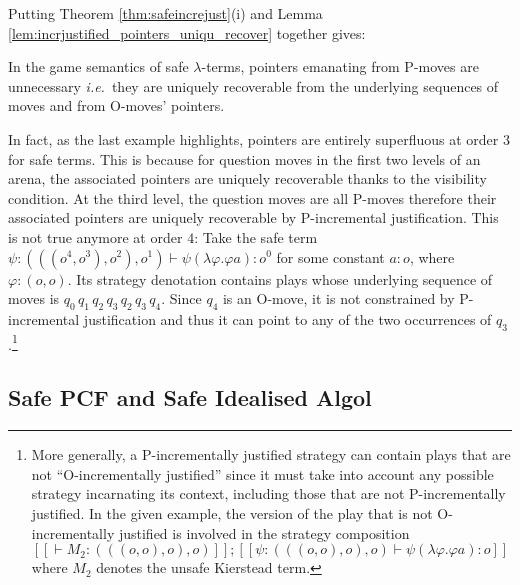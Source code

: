 \documentclass{llncs}
\newcommand{\sem}[1]{{[\![ #1 ]\!]}}
\begin{document}
Putting Theorem \ref{thm:safeincrejust}(i) and Lemma
\ref{lem:incrjustified_pointers_uniqu_recover} together gives:
\begin{proposition}
  \label{prop:safe_ptr_recoverable} In the game semantics of safe
  $\lambda$-terms, pointers emanating from P-moves are unnecessary
  {\it i.e.}~they are uniquely recoverable from the underlying sequences of
  moves and from O-moves' pointers.
\end{proposition}


In fact, as the last example highlights, pointers are entirely superfluous at 
order $3$ for safe terms. This is because for 
question moves in the first two levels of an arena, 
the associated pointers are uniquely recoverable thanks to 
the visibility condition. At the third level, the question moves are all P-moves therefore their associated pointers are uniquely recoverable by
P-incremental justification. This is not true anymore at order $4$:
Take the safe term $\psi:(((o^4,o^3),o^2),o^1) \vdash \psi (\lambda \varphi . \varphi a) : o^0$
for some constant $a:o$, where $\varphi:(o,o)$. Its strategy denotation contains plays whose underlying sequence of moves is $q_0 \, q_1 \, q_2 \, q_3 \, q_2 \, q_3 \, q_4$.
Since $q_4$ is an O-move, it is not constrained by 
P-incremental justification and thus it can point to any of the two occurrences of $q_3$.\footnote{More generally,
a P-incrementally justified strategy can contain plays that are not ``O-incrementally justified'' since it must take into account any possible strategy incarnating its context, including those that are not P-incrementally justified.
In the given example, the version of the play that is not O-incrementally justified is involved in the strategy composition 
$\sem{ \vdash M_2 : (((o,o),o),o)} ; \sem{ \psi:(((o,o),o),o) \vdash \psi (\lambda \varphi . \varphi a):o}$ where $M_2$ denotes the unsafe Kierstead term.}

\subsection*{Safe PCF and Safe Idealised Algol}
\end{document}
